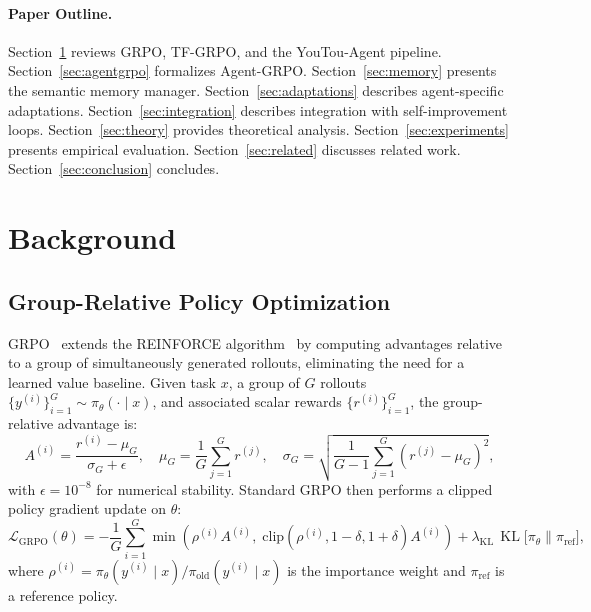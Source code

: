 \documentclass[11pt]{article}
\DeclareMathOperator{\KL}{KL}
\begin{document}
\paragraph{Paper Outline.}
Section~\ref{sec:background} reviews GRPO, TF-GRPO, and the YouTou-Agent
pipeline. Section~\ref{sec:agentgrpo} formalizes Agent-GRPO.
Section~\ref{sec:memory} presents the semantic memory manager.
Section~\ref{sec:adaptations} describes agent-specific adaptations.
Section~\ref{sec:integration} describes integration with self-improvement loops.
Section~\ref{sec:theory} provides theoretical analysis.
Section~\ref{sec:experiments} presents empirical evaluation.
Section~\ref{sec:related} discusses related work.
Section~\ref{sec:conclusion} concludes.

\section{Background}
\label{sec:background}

\subsection{Group-Relative Policy Optimization}

GRPO~\cite{shao2024deepseekmath} extends the REINFORCE
algorithm~\cite{williams1992simple} by computing advantages relative to a
group of simultaneously generated rollouts, eliminating the need for a learned
value baseline. Given task $x$, a group of $G$ rollouts
$\{y^{(i)}\}_{i=1}^G \sim \pi_\theta(\cdot \mid x)$, and associated scalar
rewards $\{r^{(i)}\}_{i=1}^G$, the group-relative advantage is:
\begin{equation}
    A^{(i)} = \frac{r^{(i)} - \mu_G}{\sigma_G + \epsilon},
    \quad \mu_G = \frac{1}{G}\sum_{j=1}^G r^{(j)},
    \quad \sigma_G = \sqrt{\frac{1}{G-1}\sum_{j=1}^G (r^{(j)} - \mu_G)^2},
    \label{eq:grpo-advantage}
\end{equation}
with $\epsilon = 10^{-8}$ for numerical stability. Standard GRPO then performs
a clipped policy gradient update on $\theta$:
\begin{equation}
    \mathcal{L}_{\text{GRPO}}(\theta) = -\frac{1}{G}\sum_{i=1}^G \min\!\left(
        \rho^{(i)} A^{(i)},\; \text{clip}(\rho^{(i)}, 1{-}\delta, 1{+}\delta) A^{(i)}
    \right) + \lambda_{\text{KL}}\,\KL\bigl[\pi_\theta \| \pi_{\text{ref}}\bigr],
    \label{eq:grpo-loss}
\end{equation}
where $\rho^{(i)} = \pi_\theta(y^{(i)} \mid x) / \pi_{\text{old}}(y^{(i)} \mid x)$
is the importance weight and $\pi_{\text{ref}}$ is a reference policy.
\end{document}
